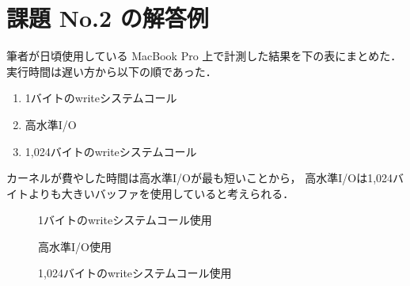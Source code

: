 \documentclass[a4j,twcolumn,11pt,nomag]{ltjarticle}      %
\begin{document}
\onecolumn
\section*{課題 No.2 の解答例}
筆者が日頃使用している MacBook Pro 上で計測した結果を下の表にまとめた．
実行時間は遅い方から以下の順であった．

\begin{enumerate}
\item 1バイトのwriteシステムコール
\item 高水準I/O
\item 1,024バイトのwriteシステムコール
\end{enumerate}

カーネルが費やした時間は高水準I/Oが最も短いことから，
高水準I/Oは1,024バイトよりも大きいバッファを使用していると考えられる．

\begin{figure}[h]
  \begin{center}
  1バイトのwriteシステムコール使用\\
  \end{center}
\end{figure}

\begin{figure}[h]
  \begin{center}
    高水準I/O使用\\
  \end{center}
\end{figure}

\begin{figure}[h]
  \begin{center}
    1,024バイトのwriteシステムコール使用\\
  \end{center}
\end{figure}
\end{document}
